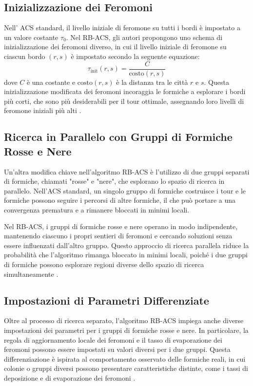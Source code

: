 \subsection{Inizializzazione dei Feromoni}
Nell' \gls{ACS} standard, il livello iniziale di feromone su tutti i bordi è impostato a un valore costante $\tau_0$. Nel \gls{RB-ACS}, gli autori propongono uno schema di inizializzazione dei feromoni diverso, in cui il livello iniziale di feromone su ciascun bordo $(r,s)$ è impostato secondo la seguente equazione:
\begin{equation}
	\tau_\text{init}(r,s) = \frac{C}{\text{costo}(r,s)}
\end{equation}
dove $C$ è una costante e $\text{costo}(r,s)$ è la distanza tra le città $r$ e $s$. Questa inizializzazione modificata dei feromoni incoraggia le formiche a esplorare i bordi più corti, che sono più desiderabili per il tour ottimale, assegnando loro livelli di feromone iniziali più alti \cite{Hassan2013}.

\subsection{Ricerca in Parallelo con Gruppi di Formiche Rosse e Nere}
Un'altra modifica chiave nell'algoritmo \gls{RB-ACS} è l'utilizzo di due gruppi separati di formiche, chiamati "rosse" e "nere", che esplorano lo spazio di ricerca in parallelo. Nell'\gls{ACS} standard, un singolo gruppo di formiche costruisce i tour e le formiche possono seguire i percorsi di altre formiche, il che può portare a una convergenza prematura e a rimanere bloccati in minimi locali.

Nel \gls{RB-ACS}, i gruppi di formiche rosse e nere operano in modo indipendente, mantenendo ciascuno i propri sentieri di feromoni e cercando soluzioni senza essere influenzati dall'altro gruppo. Questo approccio di ricerca parallela riduce la probabilità che l'algoritmo rimanga bloccato in minimi locali, poiché i due gruppi di formiche possono esplorare regioni diverse dello spazio di ricerca simultaneamente \cite{Hassan2013}.

\subsection{Impostazioni di Parametri Differenziate}
Oltre al processo di ricerca separato, l'algoritmo \gls{RB-ACS} impiega anche diverse impostazioni dei parametri per i gruppi di formiche rosse e nere. In particolare, la regola di aggiornamento locale dei feromoni e il tasso di evaporazione dei feromoni possono essere impostati su valori diversi per i due gruppi. Questa differenziazione è ispirata al comportamento osservato delle formiche reali, in cui colonie o gruppi diversi possono presentare caratteristiche distinte, come i tassi di deposizione e di evaporazione dei feromoni \cite{Hassan2013}.

